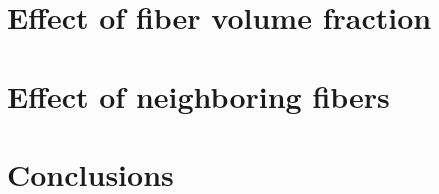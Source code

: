 \documentclass[review]{elsarticle}
\begin{document}
\section{Effect of fiber volume fraction}

\section{Effect of neighboring fibers}






\section{Conclusions}
\end{document}
